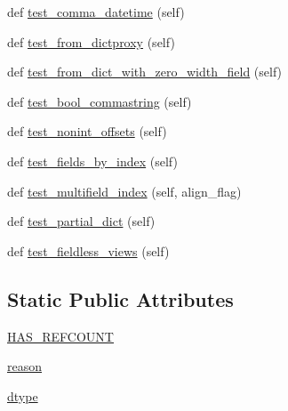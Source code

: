 \begin{DoxyCompactItemize}
\item 
def \hyperlink{classnumpy_1_1core_1_1tests_1_1test__dtype_1_1TestRecord_a361693de03a06906fdfddd0520b1a5cc}{test\+\_\+comma\+\_\+datetime} (self)
\item 
def \hyperlink{classnumpy_1_1core_1_1tests_1_1test__dtype_1_1TestRecord_a69abfe6f4628e1b966e48d9f655929ff}{test\+\_\+from\+\_\+dictproxy} (self)
\item 
def \hyperlink{classnumpy_1_1core_1_1tests_1_1test__dtype_1_1TestRecord_a987ea656382b5f72f841d798968c3482}{test\+\_\+from\+\_\+dict\+\_\+with\+\_\+zero\+\_\+width\+\_\+field} (self)
\item 
def \hyperlink{classnumpy_1_1core_1_1tests_1_1test__dtype_1_1TestRecord_a7c64e4cfdb580a9f0f72bc807a45fb98}{test\+\_\+bool\+\_\+commastring} (self)
\item 
def \hyperlink{classnumpy_1_1core_1_1tests_1_1test__dtype_1_1TestRecord_a9c4a9a941be9a5a2c60e153bc4cc88ac}{test\+\_\+nonint\+\_\+offsets} (self)
\item 
def \hyperlink{classnumpy_1_1core_1_1tests_1_1test__dtype_1_1TestRecord_a31acf0a1ecef84b4fa82149c76269deb}{test\+\_\+fields\+\_\+by\+\_\+index} (self)
\item 
def \hyperlink{classnumpy_1_1core_1_1tests_1_1test__dtype_1_1TestRecord_a93b127554e4445194533cd5f886bda58}{test\+\_\+multifield\+\_\+index} (self, align\+\_\+flag)
\item 
def \hyperlink{classnumpy_1_1core_1_1tests_1_1test__dtype_1_1TestRecord_a9b1a3a61498e4eb1d0fd127fd02328e9}{test\+\_\+partial\+\_\+dict} (self)
\item 
def \hyperlink{classnumpy_1_1core_1_1tests_1_1test__dtype_1_1TestRecord_a1a14cfd70c87d97bbc2ca5849969097d}{test\+\_\+fieldless\+\_\+views} (self)
\end{DoxyCompactItemize}
\subsection*{Static Public Attributes}
\begin{DoxyCompactItemize}
\item 
\hyperlink{classnumpy_1_1core_1_1tests_1_1test__dtype_1_1TestRecord_af69b2cb735ce2eb2b7f82649d383bb23}{H\+A\+S\+\_\+\+R\+E\+F\+C\+O\+U\+NT}
\item 
\hyperlink{classnumpy_1_1core_1_1tests_1_1test__dtype_1_1TestRecord_a68ee99ce3cb6280bf4e4a0a81f7262f0}{reason}
\item 
\hyperlink{classnumpy_1_1core_1_1tests_1_1test__dtype_1_1TestRecord_a284884905b84346bb255a12133150369}{dtype}
\end{DoxyCompactItemize}


